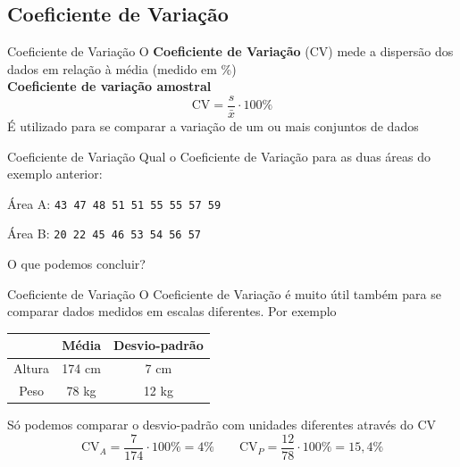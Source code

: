 \documentclass[10pt]{beamer}\usepackage[]{graphicx}\usepackage[]{color}
\theoremstyle{definition}
\begin{document}
\subsection{Coeficiente de Variação}

\begin{frame}{Coeficiente de Variação}
  O \textbf{Coeficiente de Variação} (CV) mede a dispersão dos dados em
  relação à média (medido em \%)\\ \vspace{1em}
\textbf{Coeficiente de variação amostral}
  \begin{equation*}
    \text{CV} = \frac{s}{\bar{x}} \cdot 100\%
  \end{equation*}
  É utilizado para se comparar a variação de um ou mais conjuntos de
  dados
\end{frame}

\begin{frame}{Coeficiente de Variação}
  Qual o Coeficiente de Variação para as duas áreas do exemplo anterior:
  \begin{flushleft}
    Área A: \texttt{43 47 48 51 51 55 55 57 59}
  \end{flushleft}
  \begin{flushleft}
    Área B: \texttt{20 22 45 46 53 54 56 57}
  \end{flushleft}
  O que podemos concluir?
\end{frame}

\begin{frame}{Coeficiente de Variação}
  O Coeficiente de Variação é muito útil também para se comparar dados
  medidos em escalas diferentes. Por exemplo
  \begin{table}[h]
    \centering
    \begin{tabular}{ccc}
      \hline
            & Média & Desvio-padrão \\
            \hline
            Altura & 174 cm & 7 cm \\
            Peso & 78 kg & 12 kg \\
            \hline
    \end{tabular}
  \end{table}
  Só podemos comparar o desvio-padrão com unidades diferentes através do CV
  \begin{equation*}
    \text{CV}_A = \frac{7}{174} \cdot 100\% =  4\%
    \quad \quad \text{CV}_P = \frac{12}{78} \cdot 100\% = 15,4\%
  \end{equation*}
\end{frame}
\end{document}
